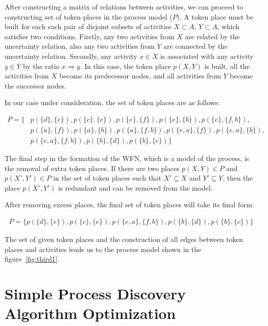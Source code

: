 \documentclass[
11pt,%
tightenlines,%
twoside,%
onecolumn,%
nofloats,%
nobibnotes,%
nofootinbib,%
superscriptaddress,%
noshowpacs,%
centertags]%
{revtex4}
\begin{document}
After constructing a matrix of relations between activities, we can proceed to constructing set of token places in the process model ($P$).
A token place must be built for each such pair of disjoint subsets of activities $X \subset A$, $Y \subset A$, which satisfies two conditions.
Firstly, any two activities from $X$ are related by the uncertainty relation, also any two activities from $Y$ are connected by the uncertainty relation.
Secondly, any activity $x \in X$ is associated with any activity $y \in Y$ by the ratio $x \Rightarrow y$.
In this case, the token place $p(X, Y)$ is built, all the activities from $X$ become its predecessor nodes, and all activities from $Y$ become the successor nodes.

In our case under consideration, the set of token places are as follows:

\begin{equation}
\begin{aligned}
P = \{
& p(\{d\}, \{e\}),
p(\{c\}, \{e\}),
p(\{e\}, \{f\}),
p(\{e\}, \{b\}),
p(\{e\}, \{f, b\}), \\
& p(\{a\}, \{f\}),
p(\{a\}, \{b\}),
p(\{a\}, \{f, b\}),
p(\{e, a\}, \{f\}),
p(\{e, a\}, \{b\}), \\
& p(\{e, a\}, \{f, b\}),
p(\{b\}, \{d\}),
p(\{b\}, \{c\})
\}
\end{aligned}
\end{equation}

The final step in the formation of the WFN, which is a model of the process, is the removal of extra token places.
If there are two places $p(X, Y) \in P$ and $p(X ', Y') \in P$ in the set of token places such that $X' \subseteq X$ and $Y' \subseteq Y$, then the place $p(X', Y')$ is redundant and can be removed from the model.

After removing excess places, the final set of token places will take its final form:

\begin{equation}
\begin{aligned}
P = \{
p(\{d\}, \{e\}), p(\{c\}, \{e\}), p(\{e, a\}, \{f, b\}), p(\{b\}, \{d\}), p(\{b\}, \{c\})
\}
\end{aligned}
\end{equation}

The set of given token places and the construction of all edges between token places and activities leads us to the process model shown in the figure~\ref{fig:third1}.

\section{Simple Process Discovery Algorithm Optimization}
\end{document}
